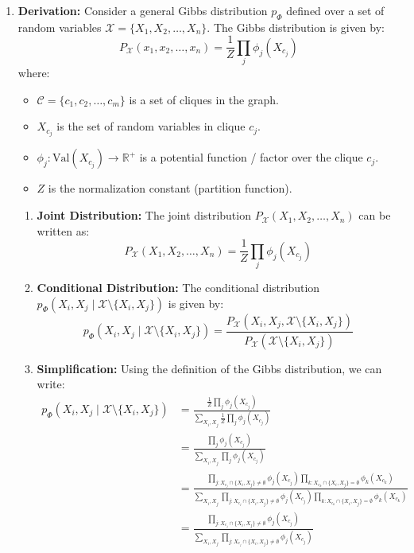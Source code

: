 \documentclass[a4 paper]{article}
\begin{document}
\begin{enumerate}
    \newpage
    \item {}


 
\textbf{Derivation:}
Consider a general Gibbs distribution \( p_\Phi \) defined over a set of random variables \( \mathcal{X} = \{X_1, X_2, \ldots, X_n\} \). The Gibbs distribution is given by:
\[
P_\mathcal{X}(x_1, x_2, \ldots, x_n) = \frac{1}{Z} \prod_{j} \phi_j(X_{c_j})
\]
where:
\begin{itemize}
    \item \( \mathcal{C} = \{c_1, c_2, \ldots, c_m\} \) is a set of cliques in the graph.
    \item \( X_{c_j} \) is the set of random variables in clique \( c_j \).
    \item \( \phi_j : \text{Val}(X_{c_j}) \to \mathbb{R}^+ \) is a potential function / factor over the clique \( c_j \).
    \item \( Z \) is the normalization constant (partition function).
\end{itemize}

\begin{enumerate}
    \item \textbf{Joint Distribution:}
    The joint distribution \( P_\mathcal{X}(X_1, X_2, \ldots, X_n) \) can be written as:
    \[
    P_\mathcal{X}(X_1, X_2, \ldots, X_n) = \frac{1}{Z} \prod_{j} \phi_j(X_{c_j})
    \]

    \item \textbf{Conditional Distribution:}
    The conditional distribution \( p_\Phi(X_i, X_j \mid \mathcal{X} \setminus \{X_i, X_j\}) \) is given by:
    \[
    p_\Phi(X_i, X_j \mid \mathcal{X} \setminus \{X_i, X_j\}) = \frac{P_\mathcal{X}(X_i, X_j, \mathcal{X} \setminus \{X_i, X_j\})}{P_\mathcal{X}(\mathcal{X} \setminus \{X_i, X_j\})}
    \]
    
    \item \textbf{Simplification:}
    Using the definition of the Gibbs distribution, we can write:
    \begin{align*}
        p_\Phi(X_i, X_j \mid \mathcal{X} \setminus \{X_i, X_j\}) &= \frac{\frac{1}{Z} \prod_{j} \phi_j(X_{c_j})}{\sum_{X_i, X_j} \frac{1}{Z} \prod_{j} \phi_j(X_{c_j})} \\
        &= \frac{\prod_{j} \phi_j(X_{c_j})}{\sum_{X_i, X_j} \prod_{j} \phi_j(X_{c_j})} \\
        &= \frac{\prod_{j: X_{c_j} \cap \{X_i, X_j\} \ne \emptyset} \phi_j(X_{c_j}) \prod_{k: X_{c_k} \cap \{X_i, X_j\} = \emptyset} \phi_k(X_{c_k})}{\sum_{X_i, X_j} \prod_{j: X_{c_j} \cap \{X_i, X_j\} \ne \emptyset} \phi_j(X_{c_j}) \prod_{k: X_{c_k} \cap \{X_i, X_j\} = \emptyset} \phi_k(X_{c_k})} \\
        &= \frac{\prod_{j: X_{c_j} \cap \{X_i, X_j\} \ne \emptyset} \phi_j(X_{c_j})}{\sum_{X_i, X_j} \prod_{j: X_{c_j} \cap \{X_i, X_j\} \ne \emptyset} \phi_j(X_{c_j})}
    \end{align*}


\end{enumerate}
\end{enumerate}
\end{document}
